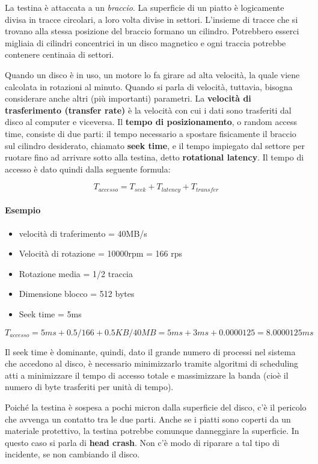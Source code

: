 \documentclass[a4paper]{article}
\begin{document}
La testina è attaccata a un \textit{braccio}. La superficie di un piatto è logicamente divisa in tracce circolari, a loro volta divise in settori. L'insieme di tracce che si trovano alla stessa posizione del braccio formano un cilindro. Potrebbero esserci migliaia di cilindri concentrici in un disco magnetico e ogni traccia potrebbe contenere centinaia di settori.

Quando un disco è in uso, un motore lo fa girare ad alta velocità, la quale viene calcolata in rotazioni al minuto. Quando si parla di velocità, tuttavia, bisogna considerare anche altri (più importanti) parametri. La \textbf{velocità di trasferimento (transfer rate)} è la velocità con cui i dati sono trasferiti dal disco al computer e viceversa. Il \textbf{tempo di posizionamento}, o random access time, consiste di due parti: il tempo necessario a spostare fisicamente il braccio sul cilindro desiderato, chiamato \textbf{seek time}, e il tempo impiegato dal settore per ruotare fino ad arrivare sotto alla testina, detto \textbf{rotational latency}.
Il tempo di accesso è dato quindi dalla seguente formula:

$$ T_{accesso} = T_{seek} + T_{latency} + T_{transfer} $$

\paragraph{Esempio}
\begin{itemize}
    \item velocità di traferimento = 40MB/s
    \item Velocità di rotazione = 10000rpm = 166 rps
    \item Rotazione media = 1/2 traccia
    \item Dimensione blocco = 512 bytes
    \item Seek time = 5ms
\end{itemize}

$$ T_{accesso} = 5 ms + 0.5/166 + 0.5 KB/40 MB = 5 ms + 3 ms + 0.0000125 = 8.0000125 ms $$

Il seek time è dominante, quindi, dato il grande numero di processi nel sistema che accedono al disco, è necessario minimizzarlo tramite algoritmi di scheduling atti a minimizzare il tempo di accesso totale e massimizzare la banda (cioè il numero di byte trasferiti per unità di tempo).

Poiché la testina è sospesa a pochi micron dalla superficie del disco, c'è il pericolo che avvenga un contatto tra le due parti. Anche se i piatti sono coperti da un materiale protettivo, la testina potrebbe comunque danneggiare la superficie. In questo caso si parla di \textbf{head crash}. Non c'è modo di riparare a tal tipo di incidente, se non cambiando il disco.
\end{document}
